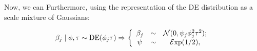 \documentclass[ba]{imsart}
\begin{document}

Now, we can Furthermore, using the representation of the \rm{DE} distribution as a scale mixture of Gaussians: 

\[
\beta_j \mid \phi , \tau \sim \text{\rm{DE}}(\phi_j \tau) \Rightarrow \left\{ \begin{array}{ccc}
\beta_j & \sim & \mathcal{N}(0 , \psi_j\phi^2_j\tau^2); \\
\psi & \sim & \mathcal{E}\mathrm{xp}(1/2),
\end{array} \right. 
\] 
\end{document}
